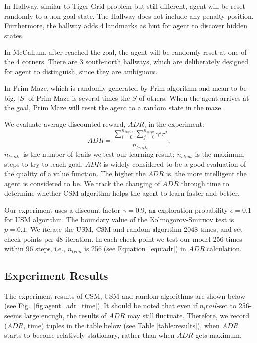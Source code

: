 \documentclass[conference]{IEEEtran}
\begin{document}
	In Hallway, similar to Tiger-Grid problem but still different, agent will be reset randomly
	to a non-goal state. The Hallway does not include any penalty position. Furthermore, the hallway
	adds 4 landmarks as hint for agent to discover hidden states.
	
	In McCallum, after reached the goal, the agent will be randomly reset at one of the 4 corners.
	There are 3 south-north hallways, which are deliberately designed for agent to distinguish, since
	they are ambiguous. 
	
	In Prim Maze, which is randomly generated by Prim algorithm and mean to be big. $|S|$ of Prim Maze
	is several times the $S$ of others. When the agent arrives at the goal, Prim Maze will reset
	the agent to a random state in the maze.
	
	We evaluate average discounted reward, $ADR$, in the experiment:
	\begin{equation}
	ADR = \frac{\sum_{i=0}^{n_{trails}} \sum_{j=0}^{n_{steps}} \gamma^j r^j}{n_{trails}}, \label{equ:adr}
	\end{equation}
	$n_{trails}$ is the number of trails we test our learning result; $n_{steps}$ is the maximum
	steps to try to reach goal. $ADR$ is widely considered to be a good evaluation of the quality of
	a value function. The higher the $ADR$ is, the more intelligent the agent is considered to be.
	We track the changing of $ADR$ through time to determine whether CSM algorithm helps the agent to learn
	faster and better.
	
	Our experiment uses a discount factor $\gamma=0.9$, an exploration probability $\epsilon=0.1$ for USM algorithm.
	The boundary value of the Kolmogorov-Smirnov test is $p=0.1$. We iterate the USM, CSM and random algorithm
	2048 times, and set check points per 48 iteration. In each check point we test our model 256 times
	within 96 steps, i.e., $n_{trial}$ is 256 (see Equation~\ref{equ:adr}) in $ADR$ calculation.
	
	\subsection{Experiment Results}
	
	The experiment results of CSM, USM and random algorithms are shown below (see Fig.~\ref{fig:agent_adr_time}).
	It should be noted that even if $n_trail$-set to 256-seems large enough, the results of $ADR$ may still fluctuate.
	Therefore, we record ($ADR$, time) tuples in the table below (see Table \ref{table:results}), when $ADR$ starts
	to become relatively stationary, rather than when $ADR$ gets maximum. 
	
\end{document}
